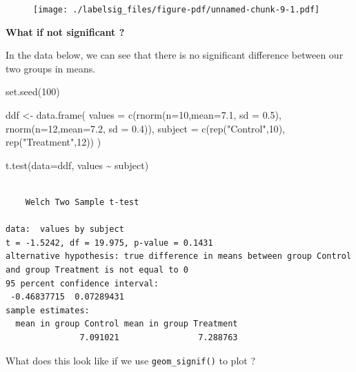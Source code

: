 \documentclass[
  letterpaper,
  DIV=11,
  numbers=noendperiod]{scrreprt}
\newenvironment{Shaded}{\begin{snugshade}}{\end{snugshade}}
\newcommand{\AttributeTok}[1]{\textcolor[rgb]{0.40,0.45,0.13}{#1}}
\newcommand{\DecValTok}[1]{\textcolor[rgb]{0.68,0.00,0.00}{#1}}
\newcommand{\FloatTok}[1]{\textcolor[rgb]{0.68,0.00,0.00}{#1}}
\newcommand{\FunctionTok}[1]{\textcolor[rgb]{0.28,0.35,0.67}{#1}}
\newcommand{\NormalTok}[1]{\textcolor[rgb]{0.00,0.23,0.31}{#1}}
\newcommand{\OtherTok}[1]{\textcolor[rgb]{0.00,0.23,0.31}{#1}}
\newcommand{\SpecialCharTok}[1]{\textcolor[rgb]{0.37,0.37,0.37}{#1}}
\newcommand{\StringTok}[1]{\textcolor[rgb]{0.13,0.47,0.30}{#1}}
\begin{document}
\begin{figure}[H]

{\centering \texttt{[image: ./labelsig\_files/figure-pdf/unnamed-chunk-9-1.pdf]}

}

\end{figure}

\textbf{What if not significant ?}

In the data below, we can see that there is no significant difference
between our two groups in means.

\begin{Shaded}
\begin{Highlighting}[]
\FunctionTok{set.seed}\NormalTok{(}\DecValTok{100}\NormalTok{)}

\NormalTok{ddf }\OtherTok{\textless{}{-}} \FunctionTok{data.frame}\NormalTok{(}
  \AttributeTok{values =} \FunctionTok{c}\NormalTok{(}\FunctionTok{rnorm}\NormalTok{(}\AttributeTok{n=}\DecValTok{10}\NormalTok{,}\AttributeTok{mean=}\FloatTok{7.1}\NormalTok{, }\AttributeTok{sd =} \FloatTok{0.5}\NormalTok{), }
             \FunctionTok{rnorm}\NormalTok{(}\AttributeTok{n=}\DecValTok{12}\NormalTok{,}\AttributeTok{mean=}\FloatTok{7.2}\NormalTok{, }\AttributeTok{sd =} \FloatTok{0.4}\NormalTok{)),}
  \AttributeTok{subject =} \FunctionTok{c}\NormalTok{(}\FunctionTok{rep}\NormalTok{(}\StringTok{"Control"}\NormalTok{,}\DecValTok{10}\NormalTok{), }\FunctionTok{rep}\NormalTok{(}\StringTok{"Treatment"}\NormalTok{,}\DecValTok{12}\NormalTok{))}
\NormalTok{)}

\FunctionTok{t.test}\NormalTok{(}\AttributeTok{data=}\NormalTok{ddf, values }\SpecialCharTok{\textasciitilde{}}\NormalTok{ subject)}
\end{Highlighting}
\end{Shaded}

\begin{verbatim}

    Welch Two Sample t-test

data:  values by subject
t = -1.5242, df = 19.975, p-value = 0.1431
alternative hypothesis: true difference in means between group Control and group Treatment is not equal to 0
95 percent confidence interval:
 -0.46837715  0.07289431
sample estimates:
  mean in group Control mean in group Treatment 
               7.091021                7.288763 
\end{verbatim}

What does this look like if we use \texttt{geom\_signif()} to plot ?
\end{document}
